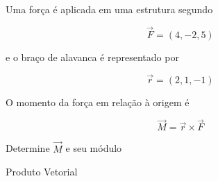 \begin{question}
  Uma força é aplicada em uma estrutura segundo

  \[
  \vec F=(4,-2,5)
  \]

  e o braço de alavanca é representado por

  \[
  \vec r=(2,1,-1)
  \]

  O momento da força em relação à origem é

  \[
  \vec M=\vec r\times\vec F
  \]

  Determine $\vec M$ e seu módulo
\end{question}

\begin{resolution}{Produto Vetorial}

\end{resolution}

\endinput
